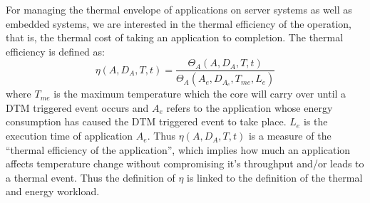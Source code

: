For managing the thermal envelope of applications on server systems as
well as embedded systems, we are interested in the thermal efficiency of
the operation, that is, the thermal cost of taking an application to
completion. The thermal efficiency is defined as:
\begin{equation}
\label{eq:thermeff}
      \eta(A, D_{A},T,t) = \frac{\Theta_A(A,D_{A}, T,t)}{\Theta_A(A_e,D_{A_{e}}, T_{me}, L_{e})}
\end{equation}
where $T_{me}$ is the maximum temperature which the core will carry
over until a DTM triggered event occurs and $A_e$ refers to the application
whose energy consumption has caused the DTM triggered event to take
place. $L_{e}$ is the execution time of application $A_e$. Thus
$\eta(A, D_{A},T,t)$ is a measure of the ``thermal efficiency of the
application'', which implies how much an application affects temperature
change without compromising it's throughput and/or leads to a thermal
event. Thus the definition of $\eta$ is linked to the definition of the
thermal and energy workload.

